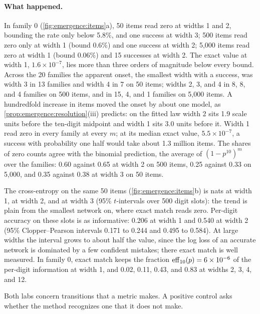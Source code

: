 \begin{refsection}
\paragraph{What happened.} In family 0 (\cref{fig:emergence:items}a), 50 items read zero at widths 1 and 2, bounding the rate only below 5.8\%, and one success at width 3; 500 items read zero only at width 1 (bound 0.6\%) and one success at width 2; 5,000 items read zero at width 1 (bound 0.06\%) and 15 successes at width 2. The exact value at width 1, $1.6\times10^{-7}$, lies more than three orders of magnitude below every bound. Across the 20 families the apparent onset, the smallest width with a success, was width 3 in 13 families and width 4 in 7 on 50 items; widths 2, 3, and 4 in 8, 8, and 4 families on 500 items, and in 15, 4, and 1 families on 5,000 items. A hundredfold increase in items moved the onset by about one model, as \cref{prop:emergence:resolution}(iii) predicts: on the fitted law width 2 sits 1.9 scale units before the ten-digit midpoint and width 1 sits 3.0 units before it. Width 1 read zero in every family at every $m$; at its median exact value, $5.5\times10^{-7}$, a success with probability one half would take about 1.3 million items. The shares of zero counts agree with the binomial prediction, the average of $(1-p^{10})^m$ over the families: 0.60 against 0.65 at width 2 on 500 items, 0.25 against 0.33 on 5,000, and 0.35 against 0.38 at width 3 on 50 items.

The cross-entropy on the same 50 items (\cref{fig:emergence:items}b) is  nats at width 1,  at width 2, and  at width 3 (95\% $t$-intervals over 500 digit slots): the trend is plain from the smallest network on, where exact match reads zero. Per-digit accuracy on these slots is as informative: 0.206 at width 1 and 0.540 at width 2 (95\% Clopper--Pearson intervals 0.171 to 0.244 and 0.495 to 0.584). At large widths the interval grows to about half the value, since the log loss of an accurate network is dominated by a few confident mistakes; there exact match is well measured. In family 0, exact match keeps the fraction $\mathrm{eff}_{10}(p)=6\times10^{-6}$ of the per-digit information at width 1, and 0.02, 0.11, 0.43, and 0.83 at widths 2, 3, 4, and 12.

Both labs concern transitions that a metric makes. A positive control asks whether the method recognizes one that it does not make.


\end{refsection}
